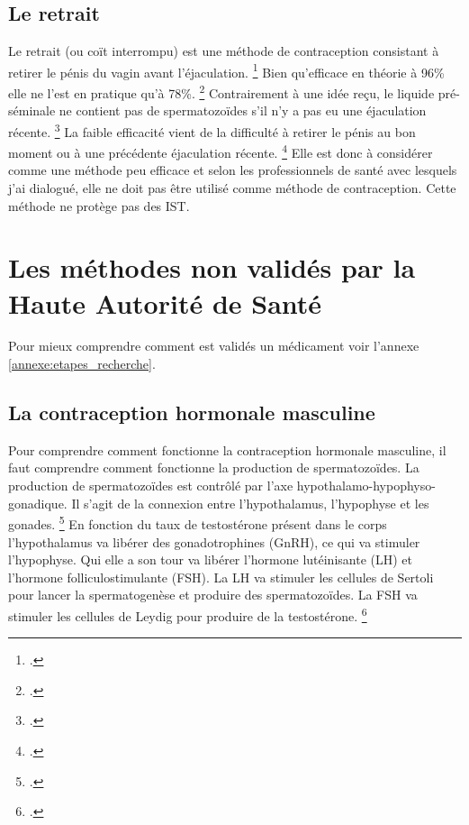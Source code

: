 \documentclass[12pt,a4paper]{report}
\begin{document}
\subsection{Le retrait}

Le retrait (ou coït interrompu) est une méthode de contraception consistant à retirer le pénis du vagin avant l'éjaculation. \footcite{CoitInterrompuWikipedia}
Bien qu'efficace en théorie à 96\% elle ne l'est en pratique qu'à 78\%. \footcite{TousMoyensContraception2023}
Contrairement à une idée reçu, le liquide pré-séminale ne contient pas de spermatozoïdes s'il n'y a pas eu une éjaculation récente. \footcite{freeMaleContraceptionPrescription}
La faible efficacité vient de la difficulté à retirer le pénis au bon moment ou à une précédente éjaculation récente. \footcite{CoitInterrompuWikipedia}
Elle est donc à considérer comme une méthode peu efficace et selon les professionnels de santé avec lesquels j'ai dialogué, elle ne doit pas être utilisé comme méthode de contraception.
Cette méthode ne protège pas des IST.

\section{Les méthodes non validés par la Haute Autorité de Santé}

Pour mieux comprendre comment est validés un médicament voir l'annexe \ref{annexe:etapes_recherche}.

\subsection{La contraception hormonale masculine}

Pour comprendre comment fonctionne la contraception hormonale masculine, il faut comprendre comment fonctionne la production de spermatozoïdes.
La production de spermatozoïdes est contrôlé par l'axe hypothalamo-hypophyso-gonadique. Il s'agit de la connexion entre l’hypothalamus, l’hypophyse et les gonades. \footcite{HypothalamicPituitaryGonadal2022}
En fonction du taux de testostérone présent dans le corps l'hypothalamus va libérer des gonadotrophines (GnRH), ce qui va stimuler l'hypophyse. Qui elle a son tour va libérer l'hormone lutéinisante (LH) et l'hormone folliculostimulante (FSH).
La LH va stimuler les cellules de Sertoli pour lancer la spermatogenèse et produire des spermatozoïdes. La FSH va stimuler les cellules de Leydig pour produire de la testostérone. \footcite{abbeMaleContraception2020}
\end{document}
